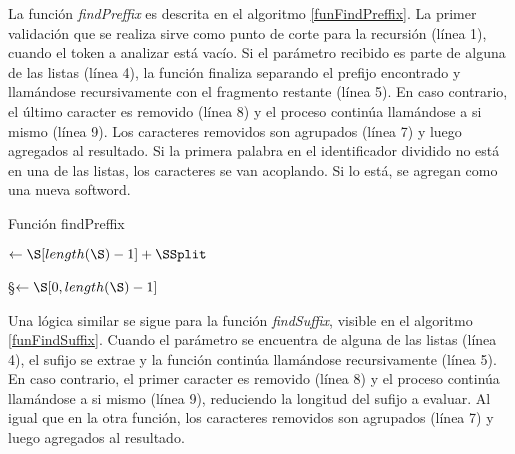 La función \textit{findPreffix} es descrita en el algoritmo \ref{funFindPreffix}. 
La primer validación que se realiza sirve como punto de corte para la recursión (línea 1), cuando el token a analizar está vacío.
Si el parámetro recibido es parte de alguna de las listas (línea 4), la función finaliza separando el prefijo encontrado y llamándose recursivamente con el fragmento restante (línea 5).
En caso contrario, el último caracter es removido (línea 8) y el proceso continúa llamándose a si mismo (línea 9).
Los caracteres removidos son agrupados (línea 7) y luego agregados al resultado. 
Si la primera palabra en el identificador dividido no está en una de las listas, los caracteres se van acoplando. Si lo está, se agregan como una nueva softword.

\begin{algorithm}
\caption{Función findPreffix}
\label{funFindPreffix}
\DontPrintSemicolon
  
  
  
  \BlankLine
  
  \BlankLine
  
  \BlankLine
  \SSplit $\leftarrow \S[length(\S) - 1] + \SSplit$\;
  
  \BlankLine
  \S $\leftarrow \S[0, length(\S) - 1]$\;
  
  \BlankLine
  \KwRet \FindPreffixSSSplit
\end{algorithm}

Una lógica similar se sigue para la función \textit{findSuffix}, visible en el algoritmo \ref{funFindSuffix}. 
Cuando el parámetro se encuentra de alguna de las listas (línea 4), el sufijo se extrae y la función continúa llamándose recursivamente (línea 5).
En caso contrario, el primer caracter es removido (línea 8) y el proceso continúa llamándose a si mismo (línea 9), reduciendo la longitud del sufijo a evaluar.
Al igual que en la otra función, los caracteres removidos son agrupados (línea 7) y luego agregados al resultado.

